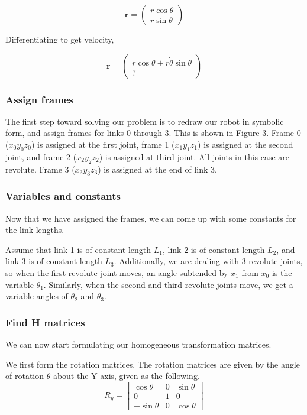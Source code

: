 \documentclass[conference]{IEEEtran}
\begin{document}
\[
    \textbf{r} =
    \begin{pmatrix}
        r \cos \theta\\
        r \sin \theta
    \end{pmatrix}
\]

Differentiating to get velocity,

\[
    \dot{\textbf{r}} =
    \begin{pmatrix}
        \dot{r} \cos \theta + r \dot{\theta} \sin \theta\\
        ?
    \end{pmatrix}
\]

\subsubsection{Assign frames}
The first step toward solving our problem is to redraw our robot in symbolic
form, and assign frames for links 0 through 3. This is shown in
Figure 3. Frame 0 ($x_0 y_0 z_0$) is assigned at the first joint, frame 1
($x_1 y_1 z_1$) is assigned at the
second joint, and frame 2 ($x_2 y_2 z_2$)
 is assigned at third joint. All joints in this case are revolute.
 Frame 3 ($x_3 y_3 z_3$) is assigned at
the end of link 3.\\

\subsubsection{Variables and constants}
Now that we have assigned the frames, we can come up with some constants for
the link lengths. 

Assume that link 1 is of constant length $L_1$, link 2 is 
of constant length $L_2$, and link 3 is of constant length $L_3$. Additionally,
we are dealing with 3 revolute joints, so when the first revolute joint moves,
an angle subtended by $x_1$ from $x_0$ is the variable $\theta_1$. Similarly,
when the second and third revolute joints move, we get a variable angles of
$\theta_2$ and $\theta_3$.

\subsubsection{Find H matrices}
We can now start formulating our homogeneous transformation matrices.

We first form the rotation matrices. The rotation matrices are given by
the angle of rotation $\theta$ about the Y axis, given as the following.
\begin{equation*}
    R_y =
    \begin{bmatrix}
         \cos\theta  & 0 & \sin\theta\\
         0 & 1 & 0\\
         -\sin\theta & 0 & \cos\theta
    \end{bmatrix}
\end{equation*}
\end{document}
